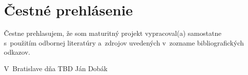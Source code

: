 \chapter*{Čestné prehlásenie}

Čestne prehlasujem, že som maturitný projekt vypracoval(a) samostatne
s~použitím odbornej literatúry a~zdrojov uvedených v~zozname
bibliografických odkazov.

\vspace{2cm}
\noindent
V~Bratislave dňa TBD \hfill Ján Dobák
